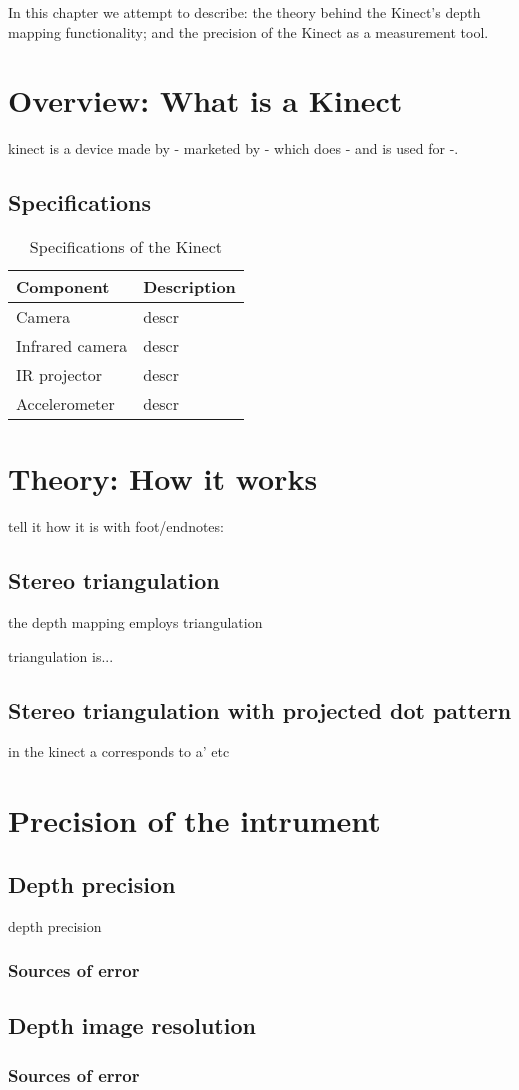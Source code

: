 In this chapter we attempt to describe: the theory behind the Kinect's depth
mapping functionality; and the precision of the Kinect as a measurement tool.

\section{Overview: What is a Kinect}

kinect is a device made by - marketed by - which does - and is used for -.

\subsection{Specifications}

\begin{table}[h]
\centering
\begin{tabular}{l l}
\toprule
Component & Description \\
\midrule
Camera & descr \\
Infrared camera& descr \\
IR projector& descr \\
Accelerometer& descr \\
\bottomrule
\end{tabular}
\caption{Specifications of the Kinect}
\label{tab:specs}
\end{table}

\section{Theory: How it works}

tell it how it is with foot/endnotes:

\subsection{Stereo triangulation}

the depth mapping employs triangulation

triangulation is...

\subsection{Stereo triangulation with projected dot pattern}

in the kinect a corresponds to a' etc


\section{Precision of the intrument}

\subsection{Depth precision}
depth precision

\subsubsection{Sources of error}

\subsection{Depth image resolution}

\subsubsection{Sources of error}
